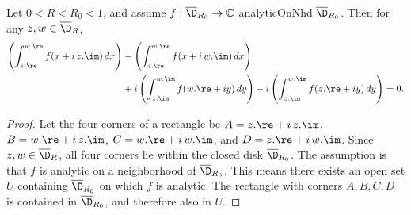\begin{lemma} \label{lem:cauchy_for_rectangles}
\leanok
Let $0<R<R_0<1$, and assume $f:\overline{\D}_{R_0}\to\mathbb{C}$ analyticOnNhd $\overline{\D}_{R_0}$. Then for any $z, w \in \overline{\D}_{R}$,
\begin{align*}
\left(\int_{z.\re}^{w.\re} f(x + i\,z.\im) \,dx\right) &- \left(\int_{z.\re}^{w.\re} f(x + i\,w.\im) \,dx\right) \\
&+ i \left(\int_{z.\im}^{w.\im} f(w.\re + i y) \,dy\right) - i \left(\int_{z.\im}^{w.\im} f(z.\re + i y) \,dy\right) = 0.
\end{align*}
\end{lemma}
\begin{proof}
\leanok
Let the four corners of a rectangle be $A = z.\re + i\,z.\im$, $B = w.\re + i\,z.\im$, $C = w.\re + i\,w.\im$, and $D = z.\re + i\,w.\im$. Since $z, w \in \overline{\D}_{R}$, all four corners lie within the closed disk $\overline{\D}_{R_0}$.
The assumption is that $f$ is analytic on a neighborhood of $\overline{\D}_{R_0}$. This means there exists an open set $U$ containing $\overline{\D}_{R_0}$ on which $f$ is analytic. The rectangle with corners $A, B, C, D$ is contained in $\overline{\D}_{R_0}$, and therefore also in $U$.


\end{proof}

